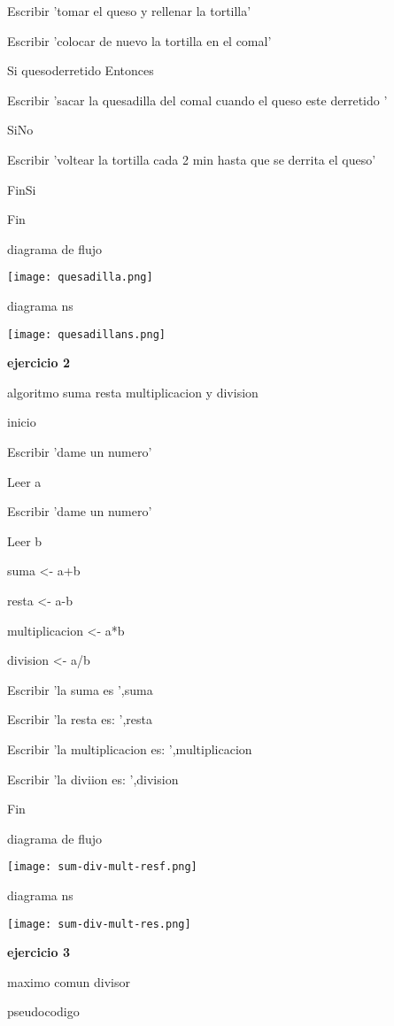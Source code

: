 \documentclass[10pt,a4paper]{article}
\begin{document}
\begin{multicols}{2}
	Escribir 'tomar el queso y rellenar la tortilla'

	Escribir 'colocar de nuevo la tortilla en el comal'

	Si quesoderretido Entonces

		Escribir 'sacar la quesadilla del comal cuando el queso este 
		derretido '

	SiNo

		Escribir 'voltear la tortilla cada 2 min hasta que se derrita el 
		queso'

	FinSi

Fin

diagrama de flujo 

\texttt{[image: quesadilla.png]} 


diagrama ns

\texttt{[image: quesadillans.png]}

\begin{center}
\textbf{ejercicio 2}
\end{center}

algoritmo suma resta multiplicacion y division 

inicio 

	Escribir 'dame un numero'

	Leer a

	Escribir 'dame un numero'

	Leer b

	suma <- a+b

	resta <- a-b

	multiplicacion <- a*b

	division <- a/b

	Escribir 'la suma es ',suma

	Escribir 'la resta es: ',resta

	Escribir 'la multiplicacion es: ',multiplicacion
	
	Escribir 'la diviion es: ',division

Fin

diagrama de flujo 
 
\texttt{[image: sum-div-mult-resf.png]} 
	
diagrama ns

\texttt{[image: sum-div-mult-res.png]} 

\begin{center}
\textbf{ejercicio 3}
\end{center}	

maximo comun divisor

pseudocodigo


\end{multicols}
\end{document}
